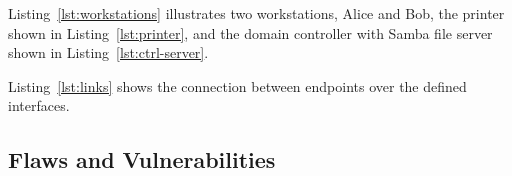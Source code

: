Listing~\ref{lst:workstations} illustrates two workstations, Alice and Bob, the printer shown in Listing~\ref{lst:printer}, and the domain controller with Samba file server shown in Listing~\ref{lst:ctrl-server}.


Listing~\ref{lst:links} shows the connection between endpoints over the defined interfaces.

\subsection{Flaws and Vulnerabilities}\label{subsec:flaws-and-vulnerabilities}


